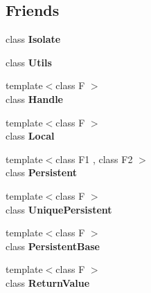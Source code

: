 \subsection*{Friends}
\begin{DoxyCompactItemize}
\item 
\hypertarget{classv8_1_1_persistent_base_aba4f0964bdacf2bbf62cf876e5d28d0a}{}class {\bfseries Isolate}\label{classv8_1_1_persistent_base_aba4f0964bdacf2bbf62cf876e5d28d0a}

\item 
\hypertarget{classv8_1_1_persistent_base_abc0f7da619e9e72510dc07ed7b5ff6d8}{}class {\bfseries Utils}\label{classv8_1_1_persistent_base_abc0f7da619e9e72510dc07ed7b5ff6d8}

\item 
\hypertarget{classv8_1_1_persistent_base_a67ca1a2d91273eaf85fb3d23ba8ce984}{}{\footnotesize template$<$class F $>$ }\\class {\bfseries Handle}\label{classv8_1_1_persistent_base_a67ca1a2d91273eaf85fb3d23ba8ce984}

\item 
\hypertarget{classv8_1_1_persistent_base_afb872edb4aac7ba55f0da004113aa2b0}{}{\footnotesize template$<$class F $>$ }\\class {\bfseries Local}\label{classv8_1_1_persistent_base_afb872edb4aac7ba55f0da004113aa2b0}

\item 
\hypertarget{classv8_1_1_persistent_base_ad845ec8872174be0a9ca9a3dd1898d30}{}{\footnotesize template$<$class F1 , class F2 $>$ }\\class {\bfseries Persistent}\label{classv8_1_1_persistent_base_ad845ec8872174be0a9ca9a3dd1898d30}

\item 
\hypertarget{classv8_1_1_persistent_base_aa15762bfc503091516cc63d53c9dbe12}{}{\footnotesize template$<$class F $>$ }\\class {\bfseries Unique\+Persistent}\label{classv8_1_1_persistent_base_aa15762bfc503091516cc63d53c9dbe12}

\item 
\hypertarget{classv8_1_1_persistent_base_abb172e0bb22fc5fed7a3a66f29d046ce}{}{\footnotesize template$<$class F $>$ }\\class {\bfseries Persistent\+Base}\label{classv8_1_1_persistent_base_abb172e0bb22fc5fed7a3a66f29d046ce}

\item 
\hypertarget{classv8_1_1_persistent_base_a53f604d3d6f2dc0647df33c9979f116a}{}{\footnotesize template$<$class F $>$ }\\class {\bfseries Return\+Value}\label{classv8_1_1_persistent_base_a53f604d3d6f2dc0647df33c9979f116a}


\end{DoxyCompactItemize}
